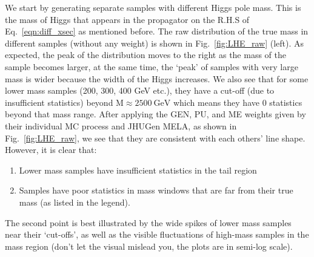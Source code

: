 We start by generating separate samples with different Higgs pole mass.
This is the mass of Higgs that appears in the propagator on 
the R.H.S of Eq.~\ref{eqn:diff_xsec} as mentioned before. The raw distribution of the true mass
in different samples (without any weight) is shown in Fig.~\ref{fig:LHE_raw} (left). As expected, 
the peak of the distribution moves to the right as the mass of the sample becomes larger, at the
same time, the `peak' of samples with very large mass is wider because the width of the Higgs increases.
We also see that for some lower mass
samples (200, 300, 400 GeV etc.), they have a cut-off (due to insufficient statistics) beyond 
$\mathrm{M}\approx\SI{2500}{\giga\electronvolt}$ which means they have 0
statistics beyond that mass range. After applying the GEN, PU, and ME weights given by their
individual MC process and JHUGen MELA, as shown in Fig.~\ref{fig:LHE_raw},
we see that they are consistent with each others' line shape. However, it is clear
that:
\begin{enumerate}[label=(\roman*)]
    \item Lower mass samples have insufficient statistics in the tail region
    \item Samples have poor statistics in mass windows that are 
        far from their true mass (as listed in the legend).
\end{enumerate}
The second point is best illustrated by the wide spikes of lower mass samples near their `cut-offs',
as well as the visible fluctuations of high-mass samples in the mass region (don't let the 
visual mislead you, the plots are in semi-log scale).
